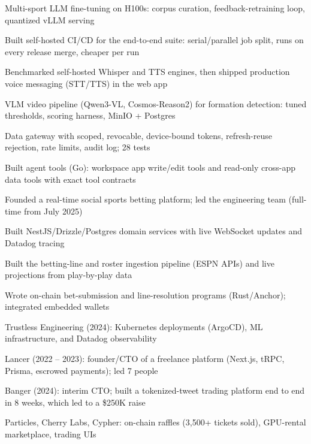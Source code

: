 \documentclass[print]{jack-resume}
\begin{document}
\begin{tightemize}
    \item Multi-sport LLM fine-tuning on H100s: corpus curation, feedback-retraining loop, quantized vLLM serving
    \item Built self-hosted CI/CD for the end-to-end suite: serial/parallel job split, runs on every release merge, cheaper per run
    \item Benchmarked self-hosted Whisper and TTS engines, then shipped production voice messaging (STT/TTS) in the web app
    \item VLM video pipeline (Qwen3-VL, Cosmos-Reason2) for formation detection: tuned thresholds, scoring harness, MinIO + Postgres
    \item Data gateway with scoped, revocable, device-bound tokens, refresh-reuse rejection, rate limits, audit log; 28 tests
    \item Built agent tools (Go): workspace app write/edit tools and read-only cross-app data tools with exact tool contracts
\end{tightemize}
\sectionsep

\begin{tightemize}
    \item Founded a real-time social sports betting platform; led the engineering team (full-time from July 2025)
    \item Built NestJS/Drizzle/Postgres domain services with live WebSocket updates and Datadog tracing
    \item Built the betting-line and roster ingestion pipeline (ESPN APIs) and live projections from play-by-play data
    \item Wrote on-chain bet-submission and line-resolution programs (Rust/Anchor); integrated embedded wallets
\end{tightemize}
\sectionsep

\begin{tightemize}
    \item Trustless Engineering (2024): Kubernetes deployments (ArgoCD), ML infrastructure, and Datadog observability
    \item Lancer (2022 – 2023): founder/CTO of a freelance platform (Next.js, tRPC, Prisma, escrowed payments); led 7 people
    \item Banger (2024): interim CTO; built a tokenized-tweet trading platform end to end in 8 weeks, which led to a \$250K raise
    \item Particles, Cherry Labs, Cypher: on-chain raffles (3,500+ tickets sold), GPU-rental marketplace, trading UIs
\end{tightemize}
\sectionsep
\end{document}
